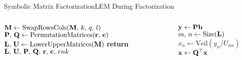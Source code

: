 \begin{frame}{Symbolic Matrix Factorization}{\ac{LEM} During Factorization}
\begin{columns}
\begin{column}[c]{0.4\textwidth}
\begin{algorithmic}
            \State $\mathbf{M} \gets \text{SwapRowsCols}(\mathbf{M}, \, k, \, q,  \, l)$ %
              \State {} %
              \State {} %
                \State {} %
              \EndFor
            \EndFor
          \EndFor
          \State $\mathbf{P}, \, \mathbf{Q} \gets \text{PermutationMatrices}(\mathbf{r}, \, \mathbf{c})$ %
          \State $\mathbf{L}, \, \mathbf{U} \gets \text{LowerUpperMatrices}(\mathbf{M})$ %
          \State \textbf{return} $\mathbf{L}, \, \mathbf{U}, \, \mathbf{P}, \, \mathbf{Q}, \, \mathbf{r}, \, \mathbf{c}, \, rnk$ %
        \EndProcedure
      \end{algorithmic}
    \end{column}
    \begin{column}[c]{0.3\textwidth}
      \vspace{-1.0em}
      \begin{algorithmic}\scriptsize
          \State $\mathbf{y} \gets \mathbf{P}\mathbf{b}$ %
          \State $m, \, n \gets \text{Size}(\mathbf{L})$ %
            \State {} %
          \EndFor
          \State $x_n \gets \text{Veil}(y_n/U_{nn})$ %
            \State {} %
            \State {}
          \EndFor
          \State $\mathbf{x} \gets \mathbf{Q}^\top\mathbf{x}$ %
        \EndProcedure
      \end{algorithmic}
    \end{column}
  \end{columns}
\end{frame}

